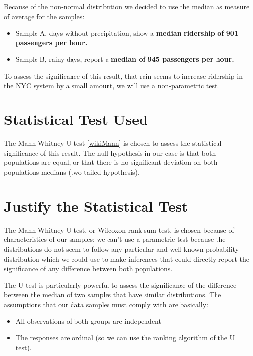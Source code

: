 \documentclass[a4paper,12pt,english]{sphinxmanual}
\begin{document}
Because of the non-normal distribution we decided to use the median as measure
of average for the samples:
\begin{itemize}
\item {} 
Sample A, days without precipitation, show a \textbf{median ridership of}
\textbf{901 passengers per hour.}

\item {} 
Sample B, rainy days, report a \textbf{median of 945 passengers per hour.}

\end{itemize}

To assess the significance of this result, that rain seems to increase ridership
in the NYC system by a small amount, we will use a non-parametric test.


\section{Statistical Test Used}
\label{section1:statistical-test-used}
The Mann Whitney U test {\hyperref[overview:wikimann]{{[}wikiMann{]}}} is chosen to assess the statistical
significance of this result. The null hypothesis in our case is that both
populations are equal, or that there is no significant deviation on both
populations medians (two-tailed hypothesis).


\section{Justify the Statistical Test}
\label{section1:justify-the-statistical-test}
The Mann Whitney U test, or Wilcoxon rank-sum test, is chosen because of
characteristics of our samples: we can't use a parametric test because the
distributions do not seem to follow any particular and well known probability
distribution which we could use to make inferences that could directly report
the significance of any difference between both populations.

The U test is particularly powerful to assess the significance of the difference
between the median of two samples that have similar distributions. The
assumptions that our data samples must comply with are basically:
\begin{itemize}
\item {} 
All observations of both groups are independent

\item {} 
The responses are ordinal (so we can use the ranking algorithm of the U test).

\end{itemize}
\end{document}

